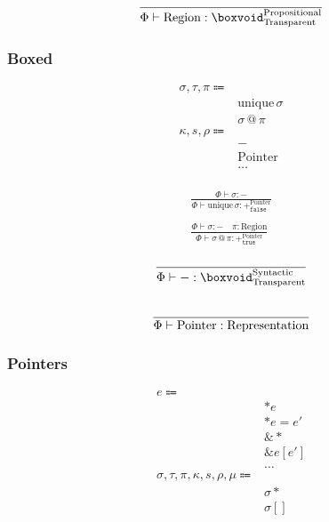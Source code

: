 \documentclass {article}
\begin{document}
\begin{gather*}
\frac
{}
{\Phi \vdash \text{Region} : \boxvoid^{\text{Propositional}}_{\text{Transparent}}} \\
\end{gather*}

\subsubsection{Boxed}
\begin{align*}
\sigma, \tau, \pi \Coloneqq & \\
& \text{unique} \, \sigma \\
& \sigma \, @ \, \pi \\
\kappa, s, \rho \Coloneqq & \\
& - \tag{Boxed} \\
& \text{Pointer} \tag{Pointer Representation} \\
& \dots \\
\end{align*}

\begin{gather*}
\frac
{\Phi \vdash \sigma : -}
{\Phi \vdash \text{unique} \, \sigma : +^\text{Pointer}_\texttt{false}} \\
\\
\frac
{\Phi \vdash \sigma : - \quad \pi : \text{Region}}
{\Phi \vdash \sigma \, @ \, \pi : +^\text{Pointer}_\texttt{true}} 
\end{gather*}

\begin{gather*}
\frac
{}
{\Phi \vdash - : \boxvoid^{\text{Syntactic}}_{\text{Transparent}}} \\
\\
\frac
{}
{\Phi \vdash \text{Pointer} : \text{Representation}} \\
\end{gather*}

\subsubsection{Pointers}
\begin{align*}
e \Coloneqq & \\
& *e \tag{Read Pointer} \\
& *e = e' \tag{Write Pointer} \\
& \& * \tag{Array to Pointer} \\
& \& e [e'] \tag{Array Increment} \\
& \dots \\
\sigma, \tau, \pi, \kappa, s, \rho, \mu \Coloneqq & \\
& \sigma* \tag{Pointer} \\
& \sigma[] \tag{Array Pointer} \\
\end{align*}
\end{document}
